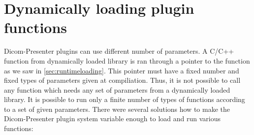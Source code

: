 \begin{comment}
First idea was to use our own way to describe plugin GUI. The first version of plugins system used it's own primitive language. Lines in description file were corresponding to GUI elements. First word of a line determined a type of an element. Other words on the line described element behaviour such as default value, minimum and maximum value or a corresponding function in a library. This own language of GUI description was sufficient but it was unnecessary to force plugin programmer to use our own language. Instead it would be better to use some existing standard.

Other way how to describe a plugin GUI was to use XML language. XML is often use in computer science to pass information in an easily processable form. Moreover Qt library includes extended tools for XML processing.

Last option is to use Qt language for UI description. Qt library uses it's own form to describe application GUI - description is in a special file with a \clist{.ui} extension. It is a strong argument for this option that it is a native way for Qt library to use this langage. Qt library provides a utility for interactive GUI creating. 
\end{comment}



\section{Dynamically loading plugin functions}

Dicom-Presenter plugins can use different number of parameters. A C/C++ function from dynamically loaded library is ran through a pointer to the function as we saw in \ref{sec:runtimeloading}. This pointer must have a fixed number and fixed types of parameters given at compiliation. Thus, it is not possible to call any function which needs any set of parameters from a dynamically loaded library. It is possible to run only a finite number of types of functions according to a set of given parameters. There were several solutions how to make the Dicom-Presenter plugin system variable enough to load and run various functions:

